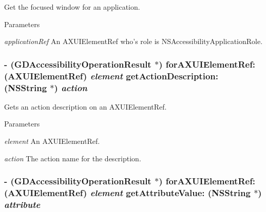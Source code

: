Get the focused window for an application. 
\begin{DoxyParams}{Parameters}
\item[{\em applicationRef}]An AXUIElementRef who's role is NSAccessibilityApplicationRole. \end{DoxyParams}
\hypertarget{interface_g_d_accessibility_manager_aec013555193c1fade98e5ae3e36f953b}{
\subsubsection[{forAXUIElementRef:getActionDescription:}]{\setlength{\rightskip}{0pt plus 5cm}-\/ ({\bf GDAccessibilityOperationResult} $\ast$) forAXUIElementRef: (AXUIElementRef) {\em element}\/ getActionDescription: (NSString $\ast$) {\em action}}}
\label{interface_g_d_accessibility_manager_aec013555193c1fade98e5ae3e36f953b}


Gets an action description on an AXUIElementRef. 
\begin{DoxyParams}{Parameters}
\item[{\em element}]An AXUIElementRef. \item[{\em action}]The action name for the description. \end{DoxyParams}
\hypertarget{interface_g_d_accessibility_manager_a07aa52aa7ad4f2a130e8448bc8bedf47}{
\subsubsection[{forAXUIElementRef:getAttributeValue:}]{\setlength{\rightskip}{0pt plus 5cm}-\/ ({\bf GDAccessibilityOperationResult} $\ast$) forAXUIElementRef: (AXUIElementRef) {\em element}\/ getAttributeValue: (NSString $\ast$) {\em attribute}}}
\label{interface_g_d_accessibility_manager_a07aa52aa7ad4f2a130e8448bc8bedf47}


